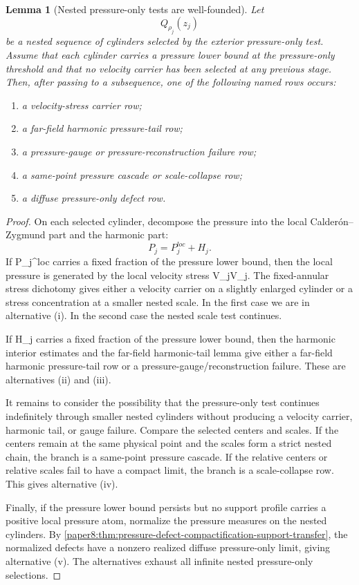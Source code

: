 \documentclass[11pt]{amsart}
\def\({}%
\def\){}%
\def\mathrm#1{#1}%
\theoremstyle{plain}
\newtheorem{lemma}[lemma]{Lemma}
\theoremstyle{definition}
\theoremstyle{remark}
\begin{document}
\begin{lemma}[Nested pressure-only tests are well-founded]
\label{paper8:lem:nested-pressure-only-well-founded}
Let
\[
   Q_{\rho_j}(z_j)
\]
be a nested sequence of cylinders selected by the exterior pressure-only test.
Assume that each cylinder carries a pressure lower bound at the pressure-only
threshold and that no velocity carrier has been selected at any previous stage.
Then, after passing to a subsequence, one of the following named rows occurs:
\begin{enumerate}[label=\textup{(\roman*)}]
\item a velocity-stress carrier row;
\item a far-field harmonic pressure-tail row;
\item a pressure-gauge or pressure-reconstruction failure row;
\item a same-point pressure cascade or scale-collapse row;
\item a diffuse pressure-only defect row.
\end{enumerate}
\end{lemma}

\begin{proof}
On each selected cylinder, decompose the pressure into the local
Calder\'on--Zygmund part and the harmonic part:
\[
   P_j=P_j^{\mathrm{loc}}+H_j.
\]
If \(P_j^{\mathrm{loc}}\) carries a fixed fraction of the pressure lower bound, then
the local pressure is generated by the local velocity stress \(V_j\otimes V_j\).
The fixed-annular stress dichotomy gives either a velocity carrier on a
slightly enlarged cylinder or a stress concentration at a smaller nested scale.
In the first case we are in alternative \textup{(i)}.  In the second case the
nested scale test continues.

If \(H_j\) carries a fixed fraction of the pressure lower bound, then the
harmonic interior estimates and the far-field harmonic-tail lemma give either a
far-field harmonic pressure-tail row or a pressure-gauge/reconstruction
failure.  These are alternatives \textup{(ii)} and \textup{(iii)}.

It remains to consider the possibility that the pressure-only test continues
indefinitely through smaller nested cylinders without producing a velocity
carrier, harmonic tail, or gauge failure.  Compare the selected centers and
scales.  If the centers remain at the same physical point and the scales form a
strict nested chain, the branch is a same-point pressure cascade.  If the
relative centers or relative scales fail to have a compact limit, the branch is
a scale-collapse row.  This gives alternative \textup{(iv)}.

Finally, if the pressure lower bound persists but no support profile carries a
positive local pressure atom, normalize the pressure measures on the nested
cylinders.  By
\cref{paper8:thm:pressure-defect-compactification-support-transfer}, the
normalized defects have a nonzero realized diffuse pressure-only limit, giving
alternative \textup{(v)}.  The alternatives exhaust all infinite nested
pressure-only selections.
\end{proof}
\end{document}
